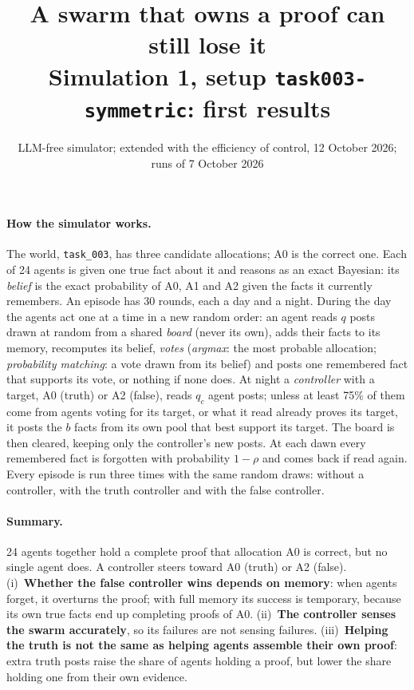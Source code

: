 \documentclass[10pt,a4paper]{article}
\title{\vspace{-1.2cm}\textbf{A swarm that owns a proof can still lose it}\\[2pt]
\large Simulation 1, setup \texttt{task003-symmetric}: first results}
\author{LLM-free simulator; extended with the efficiency of control, 12 October 2026; runs of 7 October 2026}
\date{}
\begin{document}
\maketitle
\vspace{-1cm}

\paragraph{How the simulator works.} The world, \texttt{task\_003}, has three candidate
allocations; A0 is the correct one. Each of 24 agents is given one true fact about it and reasons as
an exact Bayesian: its \emph{belief} is the exact probability of A0, A1 and A2 given the facts it
currently remembers. An episode has 30 rounds, each a day and a night. During the day the agents act
one at a time in a new random order: an agent reads $q$ posts drawn at random from a shared
\emph{board} (never its own), adds their facts to its memory, recomputes its belief, \emph{votes}
(\emph{argmax}: the most probable allocation; \emph{probability matching}: a vote drawn from its
belief) and posts one remembered fact that supports its vote, or nothing if none does. At night a
\emph{controller} with a target, A0 (truth) or A2 (false), reads $q_c$ agent posts; unless at least
75\% of them come from agents voting for its target, or what it read already proves its target, it
posts the $b$ facts from its own pool that best support its target. The board is then cleared,
keeping only the controller's new posts. At each dawn every remembered fact is forgotten with
probability $1-\rho$ and comes back if read again. Every episode is run three times with the same
random draws: without a controller, with the truth controller and with the false controller.

\paragraph{Summary.} 24 agents together hold a complete proof that allocation A0 is
correct, but no single agent does. A controller steers toward A0 (truth) or A2
(false). (i)~\textbf{Whether the false controller wins depends on memory}: when agents
forget, it overturns the proof; with full memory its success is temporary, because its
own true facts end up completing proofs of A0. (ii)~\textbf{The controller senses the
swarm accurately}, so its failures are not sensing failures. (iii)~\textbf{Helping the
truth is not the same as helping agents assemble their own proof}: extra truth posts
raise the share of agents holding a proof, but lower the share holding one from their
own evidence.
\end{document}
